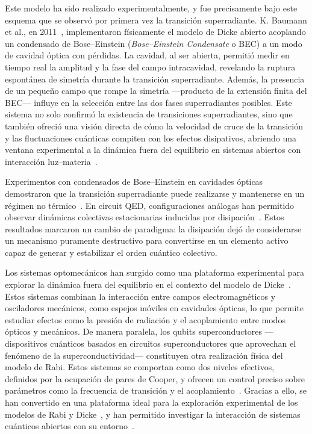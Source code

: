 \documentclass[onecolumn,notitlepage,letterpaper,aps,pra,12pt]{article}
\numberwithin{equation}{section}
\begin{document}
Este modelo ha sido realizado experimentalmente, y fue precisamente bajo este esquema que se observó por primera vez la transición superradiante. K. Baumann et al., en 2011~\cite{Baumann11}, implementaron físicamente el modelo de Dicke abierto acoplando un condensado de Bose–Einstein (\textit{Bose–Einstein Condensate} o BEC) a un modo de cavidad óptica con pérdidas. La cavidad, al ser abierta, permitió medir en tiempo real la amplitud y la fase del campo intracavidad, revelando la ruptura espontánea de simetría durante la transición superradiante. Además, la presencia de un pequeño campo que rompe la simetría —producto de la extensión finita del BEC— influye en la selección entre las dos fases superradiantes posibles. Este sistema no solo confirmó la existencia de transiciones superradiantes, sino que también ofreció una visión directa de cómo la velocidad de cruce de la transición y las fluctuaciones cuánticas compiten con los efectos disipativos, abriendo una ventana experimental a la dinámica fuera del equilibrio en sistemas abiertos con interacción luz–materia~\cite{Baumann10}.


Experimentos con condensados de Bose–Einstein en cavidades ópticas demostraron que la transición superradiante puede realizarse y mantenerse en un régimen no térmico~\cite{Baumann10,Klinder15}. En circuit QED, configuraciones análogas han permitido observar dinámicas colectivas estacionarias inducidas por disipación~\cite{Blais2021}. Estos resultados marcaron un cambio de paradigma: la disipación dejó de considerarse un mecanismo puramente destructivo para convertirse en un elemento activo capaz de generar y estabilizar el orden cuántico colectivo. %


Los sistemas optomecánicos han surgido como una plataforma experimental  para explorar la dinámica fuera del equilibrio en el contexto del modelo de Dicke~\cite{debnath2015}. Estos sistemas combinan la interacción entre campos electromagnéticos y osciladores mecánicos, como espejos móviles en cavidades ópticas, lo que permite estudiar efectos como la presión de radiación y el acoplamiento entre modos ópticos y mecánicos. De manera paralela, los qubits superconductores —dispositivos cuánticos basados en circuitos superconductores que aprovechan el fenómeno de la superconductividad— constituyen otra realización física del modelo de Rabi. Estos sistemas se comportan como dos niveles efectivos, definidos por la ocupación de pares de Cooper, y ofrecen un control preciso sobre parámetros como la frecuencia de transición y el acoplamiento~\cite{Lamata2017}. Gracias a ello, se han convertido en una plataforma ideal para la exploración experimental de los modelos de Rabi y Dicke~\cite{Mezzacapo14}, y han permitido investigar la interacción de sistemas cuánticos abiertos con su entorno~\cite{hwang2018,Lo2021}.
\end{document}
